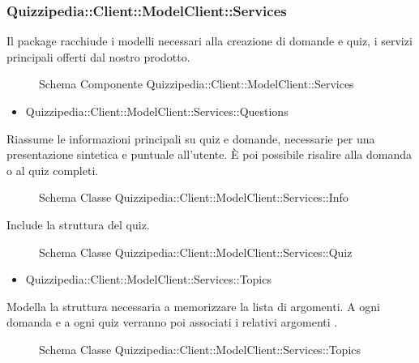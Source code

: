 \subsubsection{Quizzipedia::Client::ModelClient::Services}
Il package racchiude i modelli necessari alla creazione di domande e quiz, i servizi principali offerti dal nostro prodotto.
\begin{figure}[H]
\centering
\noindent{}
\caption{Schema Componente Quizzipedia::Client::ModelClient::Services}
\end{figure}
\begin{itemize}
\item Quizzipedia::Client::ModelClient::Services::Questions
\end{itemize}
Riassume le informazioni principali su quiz e domande, necessarie per una presentazione sintetica e puntuale all'utente. È poi possibile risalire alla domanda o al quiz completi.
\begin{figure}[H]
\centering
\noindent{}
\caption{Schema Classe Quizzipedia::Client::ModelClient::Services::Info}
\end{figure}
Include la struttura del quiz.
\begin{figure}[H]
\centering
\noindent{}
\caption{Schema Classe Quizzipedia::Client::ModelClient::Services::Quiz}
\end{figure}
\begin{itemize}
\item Quizzipedia::Client::ModelClient::Services::Topics
\end{itemize}
Modella la struttura necessaria a memorizzare la lista di argomenti. A ogni domanda e a ogni quiz verranno poi associati i relativi argomenti .
\begin{figure}[H]
\centering
\noindent{}
\caption{Schema Classe Quizzipedia::Client::ModelClient::Services::Topics}
\end{figure}
